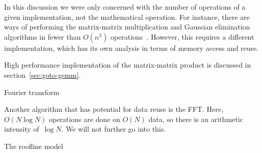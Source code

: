   In this discussion we were only concerned with the number of
  operations of a given implementation, not the mathematical
  operation. For instance, there are ways of performing the
  matrix-matrix multiplication and Gaussian elimination algorithms in
  fewer than $O(n^3)$
  operations~\cite{St:gaussnotoptimal,Pa:combinations}. However, this
  requires a different implementation, which has its own analysis in
  terms of memory access and reuse.

  High performance implementation of the matrix-matrix product
  is discussed in section~\ref{sec:goto-gemm}.

 {Fourier transform}

Another algorithm that has potential for data reuse
is the \acf{FFT}.
Here, $O(N\log N)$ operations are done on $O(N)$ data,
so there is an arithmetic intensity of~$\log N$.
We will not further go into this.

 {The roofline model}
\label{sec:roofline}

